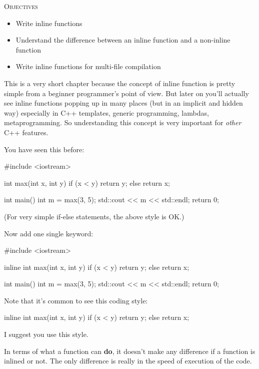 \newpage{}

\textsc{Objectives}
\begin{itemize}
\item Write inline functions
\item Understand the difference between an inline function and a non-inline function
\item Write inline functions for multi-file compilation
\end{itemize}

This is a very short chapter because the concept of inline function is pretty simple from a beginner programmer's point of view. But later on you'll actually see inline functions popping up in many places (but in an implicit and hidden way) especially in C++ templates, generic programming, lambdas, metaprogramming. So understanding this concept is very important for \textit{other} C++ features.


\newpage{}

You have seen this before:

\begin{consolethree}[escapeinside=||]
#include <iostream>

int max(int x, int y)
{
    if (x < y) return y;
    else return x;
}

int main()
{
    int m = max(3, 5);
    std::cout << m << std::endl;
    return 0;
}
\end{consolethree}

(For very simple if-else statements, the above style is OK.)

Now add one single keyword:

\begin{consolethree}[escapeinside=||]
#include <iostream>

inline int max(int x, int y)
{
    if (x < y) return y;
    else return x;
}

int main()
{
    int m = max(3, 5);
    std::cout << m << std::endl;
    return 0;
}
\end{consolethree}

Note that it's common to see this coding style:

\begin{consolethree}[escapeinside=||]
inline
int max(int x, int y)
{
    if (x < y) return y;
    else return x;
}
\end{consolethree}

I suggest you use this style.

In terms of what a function can \textbf{do}, it doesn't make any difference if a function is inlined or not. The only difference is really in the speed of execution of the code.

